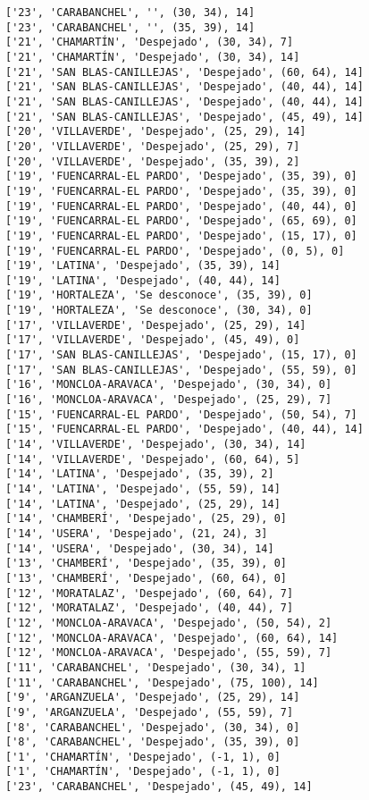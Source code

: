\documentclass[11pt]{article}
\begin{document}
\begin{Verbatim}[commandchars=\\\{\}]
['23', 'CARABANCHEL', '', (30, 34), 14]
['23', 'CARABANCHEL', '', (35, 39), 14]
['21', 'CHAMARTÍN', 'Despejado', (30, 34), 7]
['21', 'CHAMARTÍN', 'Despejado', (30, 34), 14]
['21', 'SAN BLAS-CANILLEJAS', 'Despejado', (60, 64), 14]
['21', 'SAN BLAS-CANILLEJAS', 'Despejado', (40, 44), 14]
['21', 'SAN BLAS-CANILLEJAS', 'Despejado', (40, 44), 14]
['21', 'SAN BLAS-CANILLEJAS', 'Despejado', (45, 49), 14]
['20', 'VILLAVERDE', 'Despejado', (25, 29), 14]
['20', 'VILLAVERDE', 'Despejado', (25, 29), 7]
['20', 'VILLAVERDE', 'Despejado', (35, 39), 2]
['19', 'FUENCARRAL-EL PARDO', 'Despejado', (35, 39), 0]
['19', 'FUENCARRAL-EL PARDO', 'Despejado', (35, 39), 0]
['19', 'FUENCARRAL-EL PARDO', 'Despejado', (40, 44), 0]
['19', 'FUENCARRAL-EL PARDO', 'Despejado', (65, 69), 0]
['19', 'FUENCARRAL-EL PARDO', 'Despejado', (15, 17), 0]
['19', 'FUENCARRAL-EL PARDO', 'Despejado', (0, 5), 0]
['19', 'LATINA', 'Despejado', (35, 39), 14]
['19', 'LATINA', 'Despejado', (40, 44), 14]
['19', 'HORTALEZA', 'Se desconoce', (35, 39), 0]
['19', 'HORTALEZA', 'Se desconoce', (30, 34), 0]
['17', 'VILLAVERDE', 'Despejado', (25, 29), 14]
['17', 'VILLAVERDE', 'Despejado', (45, 49), 0]
['17', 'SAN BLAS-CANILLEJAS', 'Despejado', (15, 17), 0]
['17', 'SAN BLAS-CANILLEJAS', 'Despejado', (55, 59), 0]
['16', 'MONCLOA-ARAVACA', 'Despejado', (30, 34), 0]
['16', 'MONCLOA-ARAVACA', 'Despejado', (25, 29), 7]
['15', 'FUENCARRAL-EL PARDO', 'Despejado', (50, 54), 7]
['15', 'FUENCARRAL-EL PARDO', 'Despejado', (40, 44), 14]
['14', 'VILLAVERDE', 'Despejado', (30, 34), 14]
['14', 'VILLAVERDE', 'Despejado', (60, 64), 5]
['14', 'LATINA', 'Despejado', (35, 39), 2]
['14', 'LATINA', 'Despejado', (55, 59), 14]
['14', 'LATINA', 'Despejado', (25, 29), 14]
['14', 'CHAMBERÍ', 'Despejado', (25, 29), 0]
['14', 'USERA', 'Despejado', (21, 24), 3]
['14', 'USERA', 'Despejado', (30, 34), 14]
['13', 'CHAMBERÍ', 'Despejado', (35, 39), 0]
['13', 'CHAMBERÍ', 'Despejado', (60, 64), 0]
['12', 'MORATALAZ', 'Despejado', (60, 64), 7]
['12', 'MORATALAZ', 'Despejado', (40, 44), 7]
['12', 'MONCLOA-ARAVACA', 'Despejado', (50, 54), 2]
['12', 'MONCLOA-ARAVACA', 'Despejado', (60, 64), 14]
['12', 'MONCLOA-ARAVACA', 'Despejado', (55, 59), 7]
['11', 'CARABANCHEL', 'Despejado', (30, 34), 1]
['11', 'CARABANCHEL', 'Despejado', (75, 100), 14]
['9', 'ARGANZUELA', 'Despejado', (25, 29), 14]
['9', 'ARGANZUELA', 'Despejado', (55, 59), 7]
['8', 'CARABANCHEL', 'Despejado', (30, 34), 0]
['8', 'CARABANCHEL', 'Despejado', (35, 39), 0]
['1', 'CHAMARTÍN', 'Despejado', (-1, 1), 0]
['1', 'CHAMARTÍN', 'Despejado', (-1, 1), 0]
['23', 'CARABANCHEL', 'Despejado', (45, 49), 14]

\end{Verbatim}
\end{document}
